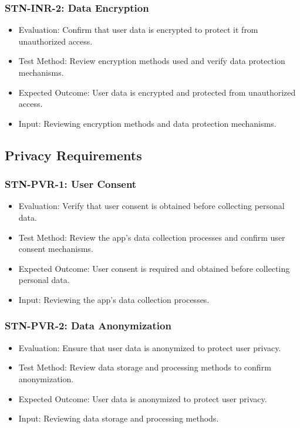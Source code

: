 \documentclass[12pt, titlepage]{article}
\begin{document}
\subsubsection{STN-INR-2: Data Encryption}
\begin{itemize}
    \item Evaluation: Confirm that user data is encrypted to protect it from unauthorized access.
    \item Test Method: Review encryption methods used and verify data protection mechanisms.
    \item Expected Outcome: User data is encrypted and protected from unauthorized access.
    \item Input: Reviewing encryption methods and data protection mechanisms.
\end{itemize}

\subsection{Privacy Requirements}

\subsubsection{STN-PVR-1: User Consent}
\begin{itemize}
    \item Evaluation: Verify that user consent is obtained before collecting personal data.
    \item Test Method: Review the app's data collection processes and confirm user consent mechanisms.
    \item Expected Outcome: User consent is required and obtained before collecting personal data.
    \item Input: Reviewing the app's data collection processes.
\end{itemize}

\subsubsection{STN-PVR-2: Data Anonymization}
\begin{itemize}
    \item Evaluation: Ensure that user data is anonymized to protect user privacy.
    \item Test Method: Review data storage and processing methods to confirm anonymization.
    \item Expected Outcome: User data is anonymized to protect user privacy.
    \item Input: Reviewing data storage and processing methods.
\end{itemize}
\end{document}
